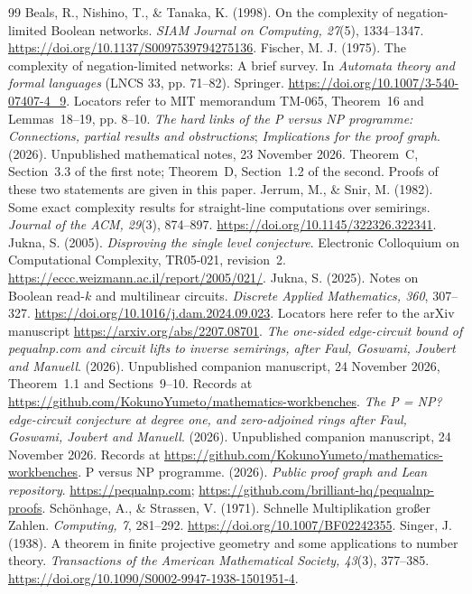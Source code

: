\documentclass[11pt]{article}
\newcommand{\recordurl}{https://github.com/KokunoYumeto/mathematics-workbenches}
\theoremstyle{definition}
\begin{document}
\begin{thebibliography}{99}
 Beals, R., Nishino, T., \& Tanaka, K. (1998). On the complexity of negation-limited Boolean networks. \emph{SIAM Journal on Computing, 27}(5), 1334--1347. \url{https://doi.org/10.1137/S0097539794275136}.
 Fischer, M. J. (1975). The complexity of negation-limited networks: A brief survey. In \emph{Automata theory and formal languages} (LNCS 33, pp. 71--82). Springer. \url{https://doi.org/10.1007/3-540-07407-4_9}. Locators refer to MIT memorandum TM-065, Theorem~16 and Lemmas~18--19, pp. 8--10.
 \emph{The hard links of the P versus NP programme: Connections, partial results and obstructions}; \emph{Implications for the proof graph}. (2026). Unpublished mathematical notes, 23 November 2026. Theorem~C, Section~3.3 of the first note; Theorem~D, Section~1.2 of the second. Proofs of these two statements are given in this paper.
 Jerrum, M., \& Snir, M. (1982). Some exact complexity results for straight-line computations over semirings. \emph{Journal of the ACM, 29}(3), 874--897. \url{https://doi.org/10.1145/322326.322341}.
 Jukna, S. (2005). \emph{Disproving the single level conjecture}. Electronic Colloquium on Computational Complexity, TR05-021, revision~2. \url{https://eccc.weizmann.ac.il/report/2005/021/}.
 Jukna, S. (2025). Notes on Boolean read-$k$ and multilinear circuits. \emph{Discrete Applied Mathematics, 360}, 307--327. \url{https://doi.org/10.1016/j.dam.2024.09.023}. Locators here refer to the arXiv manuscript \url{https://arxiv.org/abs/2207.08701}.
 \emph{The one-sided edge-circuit bound of pequalnp.com and circuit lifts to inverse semirings, after Faul, Goswami, Joubert and Manuell}. (2026). Unpublished companion manuscript, 24 November 2026, Theorem~1.1 and Sections~9--10. Records at \url{\recordurl}.
 \emph{The P = NP? edge-circuit conjecture at degree one, and zero-adjoined rings after Faul, Goswami, Joubert and Manuell}. (2026). Unpublished companion manuscript, 24 November 2026. Records at \url{\recordurl}.
 P versus NP programme. (2026). \emph{Public proof graph and Lean repository}. \url{https://pequalnp.com}; \url{https://github.com/brilliant-hq/pequalnp-proofs}.
 Sch\"onhage, A., \& Strassen, V. (1971). Schnelle Multiplikation gro{\ss}er Zahlen. \emph{Computing, 7}, 281--292. \url{https://doi.org/10.1007/BF02242355}.
 Singer, J. (1938). A theorem in finite projective geometry and some applications to number theory. \emph{Transactions of the American Mathematical Society, 43}(3), 377--385. \url{https://doi.org/10.1090/S0002-9947-1938-1501951-4}.
\end{thebibliography}
\end{document}
